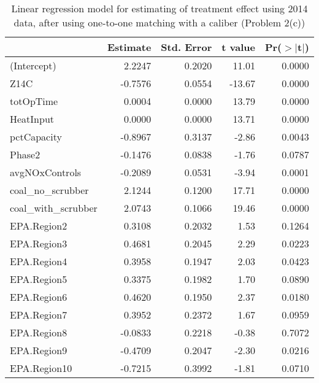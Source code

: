 \begin{table}[ht]
\centering
\begin{tabular}{lrrrr}
  \toprule
 & Estimate & Std. Error & t value & Pr($>$$|$t$|$) \\ 
  \midrule
(Intercept) & 2.2247 & 0.2020 & 11.01 & 0.0000 \\ 
  Z14C & -0.7576 & 0.0554 & -13.67 & 0.0000 \\ 
  totOpTime & 0.0004 & 0.0000 & 13.79 & 0.0000 \\ 
  HeatInput & 0.0000 & 0.0000 & 13.71 & 0.0000 \\ 
  pctCapacity & -0.8967 & 0.3137 & -2.86 & 0.0043 \\ 
  Phase2 & -0.1476 & 0.0838 & -1.76 & 0.0787 \\ 
  avgNOxControls & -0.2089 & 0.0531 & -3.94 & 0.0001 \\ 
  coal\_no\_scrubber & 2.1244 & 0.1200 & 17.71 & 0.0000 \\ 
  coal\_with\_scrubber & 2.0743 & 0.1066 & 19.46 & 0.0000 \\ 
  EPA.Region2 & 0.3108 & 0.2032 & 1.53 & 0.1264 \\ 
  EPA.Region3 & 0.4681 & 0.2045 & 2.29 & 0.0223 \\ 
  EPA.Region4 & 0.3958 & 0.1947 & 2.03 & 0.0423 \\ 
  EPA.Region5 & 0.3375 & 0.1982 & 1.70 & 0.0890 \\ 
  EPA.Region6 & 0.4620 & 0.1950 & 2.37 & 0.0180 \\ 
  EPA.Region7 & 0.3952 & 0.2372 & 1.67 & 0.0959 \\ 
  EPA.Region8 & -0.0833 & 0.2218 & -0.38 & 0.7072 \\ 
  EPA.Region9 & -0.4709 & 0.2047 & -2.30 & 0.0216 \\ 
  EPA.Region10 & -0.7215 & 0.3992 & -1.81 & 0.0710 \\ 
   \bottomrule
\end{tabular}
\caption{Linear regression model for estimating of treatment effect using 2014 data, after using one-to-one matching with a caliber (Problem 2(c))} 
\label{tab:lm-2c-14}
\end{table}


